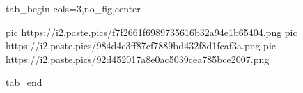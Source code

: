 
 
 
 
 


\ifcmt
  tab_begin cols=3,no_fig,center

     pic https://i2.paste.pics/f7f2661f6989735616b32a94e1b65404.png
		 pic https://i2.paste.pics/984d4c3ff87cf7889bd432f8d1fcaf3a.png
		 pic https://i2.paste.pics/92d452017a8e0ac5039cea785bce2007.png

  tab_end
\fi
